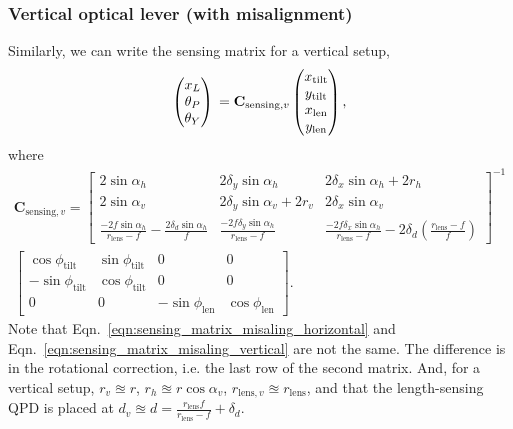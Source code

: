 \subsubsection{Vertical optical lever (with misalignment)}
Similarly, we can write the sensing matrix for a vertical setup,
\begin{equation}
	\begin{pmatrix}
		x_L\\
		\theta_P\\
		\theta_Y
	\end{pmatrix}\\
	=
	\mathbf{C}_{\mathrm{sensing},v}
	\begin{pmatrix}
		x_\mathrm{tilt}\\
		y_\mathrm{tilt}\\
		x_\mathrm{len}\\
		y_\mathrm{len}
	\end{pmatrix},
\end{equation}
where
\begin{multline}
	\mathbf{C}_{\mathrm{sensing},v}=
	\begin{bmatrix}
		2\sin\alpha_h & 2\delta_y\sin\alpha_h & 2\delta_x\sin\alpha_h + 2r_h\\
		2\sin\alpha_v & 2\delta_y\sin\alpha_v + 2r_v & 2\delta_x\sin\alpha_v\\
		\frac{-2f\sin\alpha_h}{r_\mathrm{lens}-f} - \frac{2\delta_d\sin\alpha_h}{f} & \frac{-2f\delta_y\sin\alpha_h}{r_\mathrm{lens}-f} & \frac{-2f\delta_x\sin\alpha_h}{r_\mathrm{lens}-f} - 2\delta_d\left(\frac{r_\mathrm{lens}-f}{f}\right)
	\end{bmatrix}^{-1}\\
	\begin{bmatrix}
		\cos\phi_\mathrm{tilt} & \sin\phi_\mathrm{tilt} & 0 & 0\\
		-\sin\phi_\mathrm{tilt} & \cos\phi_\mathrm{tilt} & 0 & 0\\
		0 & 0 & -\sin\phi_\mathrm{len} & \cos\phi_\mathrm{len}
	\end{bmatrix}.
	\label{eqn:sensing_matrix_misaling_vertical}
\end{multline}
Note that Eqn.~\eqref{eqn:sensing_matrix_misaling_horizontal} and Eqn.~\eqref{eqn:sensing_matrix_misaling_vertical} are not the same.
The difference is in the rotational correction, i.e. the last row of the second matrix.
And, for a vertical setup, $r_v\approxeq r$, $r_h\approxeq r\cos\alpha_v$, $r_{\mathrm{lens},v}\approxeq r_\mathrm{lens}$, and that the length-sensing QPD is placed at $d_v \approxeq d = \frac{r_\mathrm{lens}f}{r_\mathrm{lens}-f}+\delta_d$.

